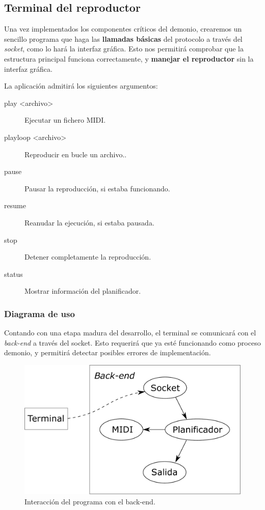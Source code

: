 \smallskip

\subsection{Terminal del reproductor}
\label{subsec:terminal}

Una vez implementados los componentes críticos del demonio, crearemos un sencillo programa que haga las \textbf{llamadas básicas} del protocolo a través del \textit{socket}, como lo hará la interfaz gráfica. Esto nos permitirá comprobar que la estructura principal funciona correctamente, y \textbf{manejar el reproductor} sin la interfaz gráfica.

La aplicación admitirá los siguientes argumentos:

\begin{description}
	\item[play <archivo>] Ejecutar un fichero \acrshort{MIDI}.
	\item[playloop <archivo>] Reproducir en bucle un archivo..
	\item[pause] Pausar la reproducción, si estaba funcionando.
	\item[resume] Reanudar la ejecución, si estaba pausada.
	\item[stop] Detener completamente la reproducción.
	\item[status] Mostrar información del planificador.
\end{description}

\subsubsection{Diagrama de uso}

Contando con una etapa madura del desarrollo, el terminal se comunicará con el \textit{back-end} a través del socket. Esto requerirá que ya esté funcionando como proceso demonio, y permitirá detectar posibles errores de implementación.

\smallskip

\begin{figure}[H]
	\noindent \begin{centering}
		\includegraphics[width=\linewidth/2]{capitulo4/terminal}
		\par\end{centering}
	\smallskip
	\caption{\label{fig:terminal} Interacción del programa con el back-end.}
\end{figure} 

